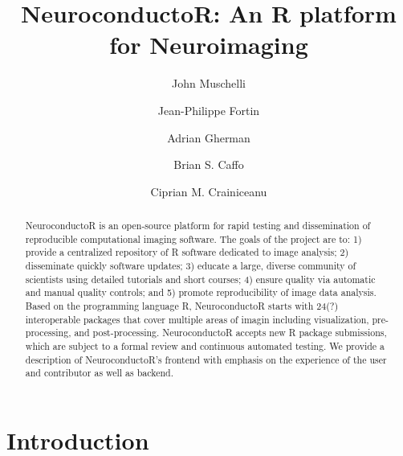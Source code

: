 \documentclass[]{elsarticle} %
\begin{document}
\begin{frontmatter}

  \title{NeuroconductoR: An R platform for Neuroimaging}
    \author[JHU]{John Muschelli}
    \author[Penn]{Jean-Philippe Fortin}
  
    \author[JHU]{Adrian Gherman}
  
    \author[JHU]{Brian S. Caffo}
  
    \author[JHU]{Ciprian M. Crainiceanu}
  
      \address[JHU]{Johns Hopkins Bloomberg School of Public Health, Department of
Biostatistics, 615 N Wolfe St, Baltimore, MD, 21205}
    \address[Penn]{Perelman School of Medicine, University of Pennsylvania, Department of
Biostatistics and Epidemiology, 423 Guardian Drive, Philadelphia, PA
19104}
  
  \begin{abstract}
NeuroconductoR is an open-source platform for rapid testing and dissemination of reproducible computational imaging software. The goals of the project are to: 1) provide a centralized repository of R software dedicated to image analysis; 2) disseminate quickly software updates; 3) educate a large, diverse community of scientists using detailed tutorials and short courses; 4) ensure quality via automatic and manual quality controls; and 5) promote reproducibility of image data analysis. Based on the  programming language R, NeuroconductoR starts with 24(?) interoperable packages that cover multiple areas of imagin including visualization, pre-processing, and post-processing. NeuroconductoR accepts new R package submissions, which are subject to a formal review and continuous automated testing. We provide a description of NeuroconductoR's frontend with emphasis on the experience of the user and contributor as well as backend.   
  \end{abstract}
  
 \end{frontmatter}

\section{Introduction}\label{introduction}
\end{document}
